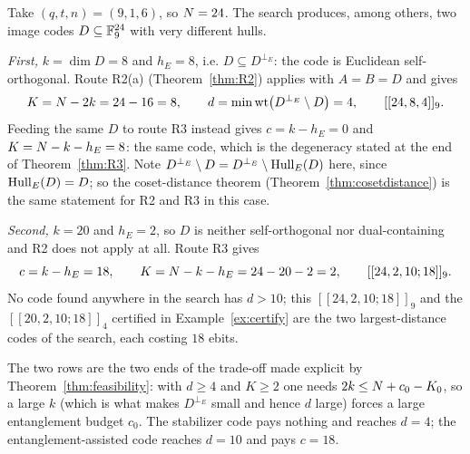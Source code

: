 \begin{example}\label{ex:routes}
Take $(q,t,n)=(9,1,6)$, so $N=24$. The search produces, among others, two
image codes $D\subseteq\mathbb F_9^{24}$ with very different hulls.

\emph{First,} $k=\dim D=8$ and $h_E=8$, i.e. $D\subseteq D^{\perp_E}$: the
code is Euclidean self-orthogonal. Route R2(a)
(Theorem~\ref{thm:R2}) applies with $A=B=D$ and gives
\[
  K=N-2k=24-16=8,\qquad
  d=\min\operatorname{wt}\bigl(D^{\perp_E}\setminus D\bigr)=4,\qquad
  [[24,8,4]]_9 .
\]
Feeding the same $D$ to route R3 instead gives $c=k-h_E=0$ and
$K=N-k-h_E=8$: the same code, which is the degeneracy stated at the end of
Theorem~\ref{thm:R3}. Note $D^{\perp_E}\setminus D=D^{\perp_E}\setminus
\operatorname{Hull}_E(D)$ here, since $\operatorname{Hull}_E(D)=D$; so the coset-distance theorem
(Theorem~\ref{thm:cosetdistance}) is the same statement for R2 and R3 in this
case.

\emph{Second,} $k=20$ and $h_E=2$, so $D$ is neither self-orthogonal nor
dual-containing and R2 does not apply at all. Route R3 gives
\[
  c=k-h_E=18,\qquad K=N-k-h_E=24-20-2=2,\qquad
  [[24,2,10;18]]_9 .
\]
No code found anywhere in the search has $d>10$; this $[[24,2,10;18]]_9$ and
the $[[20,2,10;18]]_4$ certified in Example~\ref{ex:certify} are the two
largest-distance codes of the search, each costing $18$ ebits.

The two rows are the two ends of the trade-off made explicit by
Theorem~\ref{thm:feasibility}: with $d\ge4$ and $K\ge2$ one needs
$2k\le N+c_0-K_0$, so a large $k$ (which is what makes $D^{\perp_E}$ small
and hence $d$ large) forces a large entanglement budget $c_0$. The
stabilizer code pays nothing and reaches $d=4$; the entanglement-assisted code
reaches $d=10$ and pays $c=18$.
\end{example}
